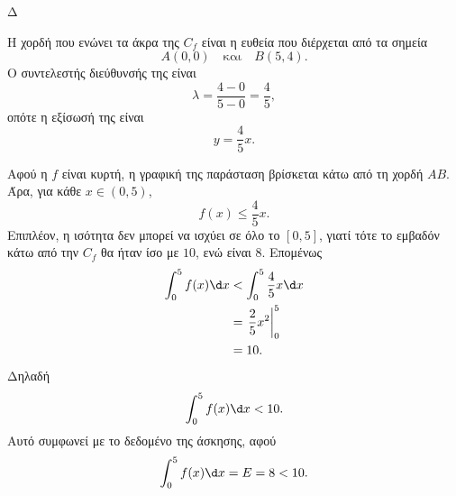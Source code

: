 \begin{thema}{Δ}
\begin{erwthma}
\item Η χορδή που ενώνει τα άκρα της $C_f$ είναι η ευθεία που διέρχεται
από τα σημεία
\[
A(0,0)\quad\text{και}\quad B(5,4).
\]
Ο συντελεστής διεύθυνσής της είναι
\[
\lambda=\frac{4-0}{5-0}=\frac45,
\]
οπότε η εξίσωσή της είναι
\[
{y=\frac45x}.
\]

Αφού η $f$ είναι κυρτή, η γραφική της παράσταση βρίσκεται κάτω από τη
χορδή $AB$. Άρα, για κάθε $x\in(0,5)$,
\[
f(x)\leq \frac45x.
\]
Επιπλέον, η ισότητα δεν μπορεί να ισχύει σε όλο το $[0,5]$, γιατί τότε
το εμβαδόν κάτω από την $C_f$ θα ήταν ίσο με $10$, ενώ είναι $8$.
Επομένως
\begin{align*}
\int_0^5 f(x)\d x
&<\int_0^5 \frac45x\d x\\
&=\left.\frac{2}{5}x^2\right|_0^5\\
&=10.
\end{align*}
Δηλαδή
\[
{\int_0^5 f(x)\d x<10}.
\]
Αυτό συμφωνεί με το δεδομένο της άσκησης, αφού
\[
\int_0^5 f(x)\d x=E=8<10.
\]
\end{erwthma}
\end{thema}

